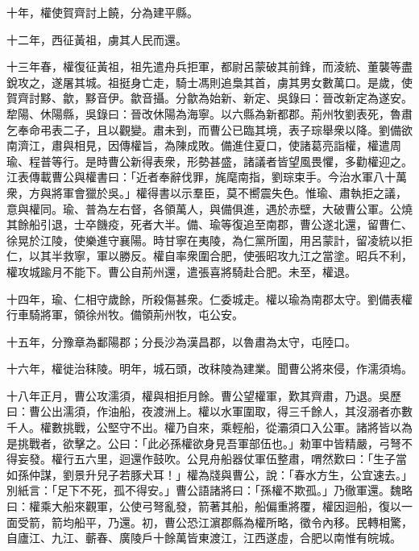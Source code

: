 \begin{pinyinscope}
十年，權使賀齊討上饒，分為建平縣。

十二年，西征黃祖，虜其人民而還。

十三年春，權復征黃祖，祖先遣舟兵拒軍，都尉呂蒙破其前鋒，而淩統、董襲等盡銳攻之，遂屠其城。祖挺身亡走，騎士馮則追梟其首，虜其男女數萬口。是歲，使賀齊討黟、歙，黟音伊。歙音攝。分歙為始新、新定、吳錄曰：晉改新定為遂安。犂陽、休陽縣，吳錄曰：晉改休陽為海寧。以六縣為新都郡。荊州牧劉表死，魯肅乞奉命弔表二子，且以觀變。肅未到，而曹公已臨其境，表子琮舉衆以降。劉備欲南濟江，肅與相見，因傳權旨，為陳成敗。備進住夏口，使諸葛亮詣權，權遣周瑜、程普等行。是時曹公新得表衆，形勢甚盛，諸議者皆望風畏懼，多勸權迎之。江表傳載曹公與權書曰：「近者奉辭伐罪，旄麾南指，劉琮束手。今治水軍八十萬衆，方與將軍會獵於吳。」權得書以示羣臣，莫不嚮震失色。惟瑜、肅執拒之議，意與權同。瑜、普為左右督，各領萬人，與備俱進，遇於赤壁，大破曹公軍。公燒其餘船引退，士卒饑疫，死者大半。備、瑜等復追至南郡，曹公遂北還，留曹仁、徐晃於江陵，使樂進守襄陽。時甘寧在夷陵，為仁黨所圍，用呂蒙計，留凌統以拒仁，以其半救寧，軍以勝反。權自率衆圍合肥，使張昭攻九江之當塗。昭兵不利，權攻城踰月不能下。曹公自荊州還，遣張喜將騎赴合肥。未至，權退。

十四年，瑜、仁相守歲餘，所殺傷甚衆。仁委城走。權以瑜為南郡太守。劉備表權行車騎將軍，領徐州牧。備領荊州牧，屯公安。

十五年，分豫章為鄱陽郡；分長沙為漢昌郡，以魯肅為太守，屯陸口。

十六年，權徙治秣陵。明年，城石頭，改秣陵為建業。聞曹公將來侵，作濡須塢。

十八年正月，曹公攻濡須，權與相拒月餘。曹公望權軍，歎其齊肅，乃退。吳歷曰：曹公出濡須，作油船，夜渡洲上。權以水軍圍取，得三千餘人，其沒溺者亦數千人。權數挑戰，公堅守不出。權乃自來，乘輕船，從灞須口入公軍。諸將皆以為是挑戰者，欲擊之。公曰：「此必孫權欲身見吾軍部伍也。」勑軍中皆精嚴，弓弩不得妄發。權行五六里，迴還作鼓吹。公見舟船器仗軍伍整肅，喟然歎曰：「生子當如孫仲謀，劉景升兒子若豚犬耳！」權為牋與曹公，說：「春水方生，公宜速去。」別紙言：「足下不死，孤不得安。」曹公語諸將曰：「孫權不欺孤。」乃徹軍還。魏略曰：權乘大船來觀軍，公使弓弩亂發，箭著其船，船偏重將覆，權因迴船，復以一面受箭，箭均船平，乃還。初，曹公恐江濵郡縣為權所略，徵令內移。民轉相驚，自廬江、九江、蘄春、廣陵戶十餘萬皆東渡江，江西遂虛，合肥以南惟有皖城。


\end{pinyinscope}
